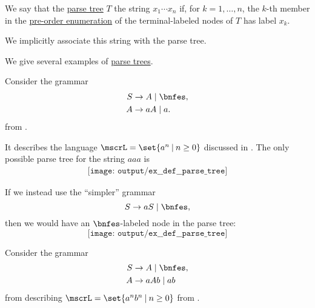 \begin{definition}\label{def:parse_tree_string}
  We say that the \hyperref[def:parse_tree]{parse tree} \( T \)  the string \( x_1 \cdots x_n \) if, for \( k = 1, \ldots, n \), the \( k \)-th member in the \hyperref[def:ordered_tree_enumeration]{pre-order enumeration} of the terminal-labeled nodes of \( T \) has label \( x_k \).
\end{definition}
\begin{comments}
  \item We implicitly associate this string with the parse tree.
\end{comments}

\begin{example}\label{ex:def:parse_tree}
  We give several examples of \hyperref[def:parse_tree]{parse trees}.

  \begin{thmenum}
     Consider the grammar
    \begin{equation*}
      \begin{aligned}
        S &\to A \mid \bnfes, \\
        A &\to aA \mid a.
      \end{aligned}
    \end{equation*}
    from .

    It describes the language \( \mscrL = \set{ a^n \given n \geq 0 } \) discussed in . The only possible parse tree for the string \( aaa \) is
    \begin{equation*}\label{eq:ex:def:parse_tree/an}
      \begin{aligned}
        \texttt{[image: output/ex\_\_def\_\_parse\_tree]}
      \end{aligned}
    \end{equation*}

    If we instead use the \enquote{simpler} grammar
    \begin{equation*}
      S \to aS \mid \bnfes,
    \end{equation*}
    then we would have an \( \bnfes \)-labeled node in the parse tree:
    \begin{equation*}
      \texttt{[image: output/ex\_\_def\_\_parse\_tree]}
    \end{equation*}

     Consider the grammar
    \begin{equation*}
      \begin{aligned}
        S &\to A \mid \bnfes, \\
        A &\to aAb \mid ab
      \end{aligned}
    \end{equation*}
    from  describing \( \mscrL = \set{ a^n b^n \given n \geq 0 } \) from .


\end{thmenum}
\end{example}

